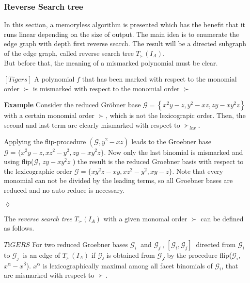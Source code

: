 \subsubsection{Reverse Search tree}
In this section, a memoryless algorithm is presented which has the benefit that it runs linear depending on the size of output. The main idea is to enumerate the edge graph with depth first reverse search. The result will be a directed subgraph of the edge graph, called reverse search tree $T_{\succ}(I_{A}) $.\\
But before that, the meaning of a mismarked polynomial must be clear.
\begin{env_definition}
$\left[Tigers \right]  $
A polynomial $f$ that has been marked with respect to the monomial order $\succ$  is mismarked with respect to the monomial order $\succ$  
\end{env_definition}


\textbf{Example}
Consider the reduced Gröbner base $\mathcal{G} = \left\lbrace x^{2}y-z,y^{2}-xz, zy-xy^{2}z \right\rbrace $ 
with a certain monomial order $\succ$, which is not the lexicograpic order.
Then, the second and last term are clearly mismarked with respect to $\succ_{lex}$.

Applying the flip-procedure $(\mathcal{G},y^{2}-xz)$ leads to the Groebner base $\mathcal{G} = \{x^{2}y-z,xz^{2}-y^{2}, zy-xy^{2}z \} $. Now only the last binomial is mismarked and using flip($\mathcal{G}$, $zy-xy^{2}z$ ) the result is the reduced Groebner basis with respect to the lexicographic order $\mathcal{G} = \{xy^{2}z -xy, xz^{2}-y^{2},xy-z \} $. Note that every monomial can not be divided by the leading terms, so all Groebner bases are reduced and no auto-reduce is necessary.
 
\begin{flushright}
$\lozenge$
\end{flushright} 

The \textit{reverse search tree} $T_{\succ}(I_{A}) $ with a given monomal order $ \succ $ can be defined as follows.
\begin{env_definition}
$TiGERS  $ For two reduced Groebner bases $ \mathcal{G}_{i}~$ and $ \mathcal{G}_{j}~$, $[\mathcal{G}_{i},\mathcal{G}_{j} ]~$ directed from $\mathcal{G}_{i}~$ to $\mathcal{G}_{j}~$ is an edge of $T_{\succ}(I_{A}) $ if $\mathcal{G_{i}}$ is obtained from $\mathcal{G_{j}}$ by the procedure flip($\mathcal{G}_{i}$,$x^{\upalpha} - x^{\upbeta}$).
$x^{\upalpha}$ is lexicographically maximal among all facet binomials of $\mathcal{G}_{i}$, that are mismarked with respect to $\succ$.
\end{env_definition}

